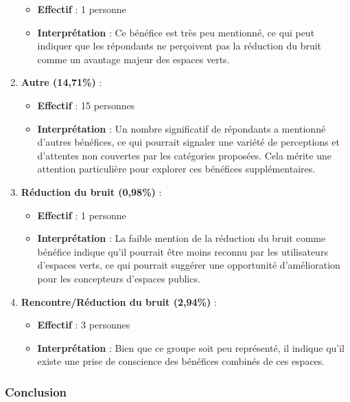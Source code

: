\documentclass[
]{article}
\providecommand{\tightlist}{%
  \setlength{\itemsep}{0pt}\setlength{\parskip}{0pt}}
\begin{document}
\begin{enumerate}
  \begin{itemize}
  \tightlist
  \item
    \textbf{Effectif} : 1 personne
  \item
    \textbf{Interprétation} : Ce bénéfice est très peu mentionné, ce qui
    peut indiquer que les répondants ne perçoivent pas la réduction du
    bruit comme un avantage majeur des espaces verts.
  \end{itemize}
\item
  \textbf{Autre (14,71\%)} :

  \begin{itemize}
  \tightlist
  \item
    \textbf{Effectif} : 15 personnes
  \item
    \textbf{Interprétation} : Un nombre significatif de répondants a
    mentionné d'autres bénéfices, ce qui pourrait signaler une variété
    de perceptions et d'attentes non couvertes par les catégories
    proposées. Cela mérite une attention particulière pour explorer ces
    bénéfices supplémentaires.
  \end{itemize}
\item
  \textbf{Réduction du bruit (0,98\%)} :

  \begin{itemize}
  \tightlist
  \item
    \textbf{Effectif} : 1 personne
  \item
    \textbf{Interprétation} : La faible mention de la réduction du bruit
    comme bénéfice indique qu'il pourrait être moins reconnu par les
    utilisateurs d'espaces verts, ce qui pourrait suggérer une
    opportunité d'amélioration pour les concepteurs d'espaces publics.
  \end{itemize}
\item
  \textbf{Rencontre/Réduction du bruit (2,94\%)} :

  \begin{itemize}
  \tightlist
  \item
    \textbf{Effectif} : 3 personnes
  \item
    \textbf{Interprétation} : Bien que ce groupe soit peu représenté, il
    indique qu'il existe une prise de conscience des bénéfices combinés
    de ces espaces.
  \end{itemize}
\end{enumerate}

\subsubsection{Conclusion}\label{conclusion-10}
\end{document}
